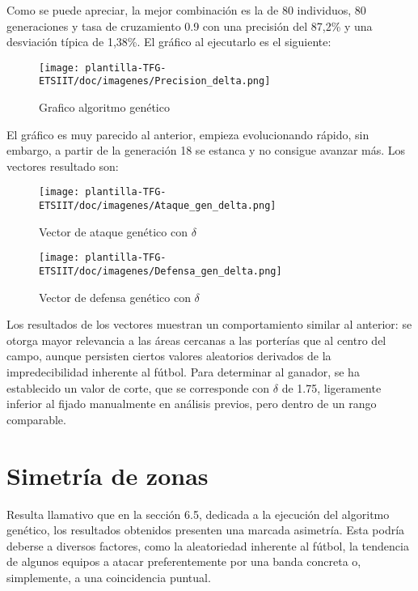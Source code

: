 Como se puede apreciar, la mejor combinación es la de 80 individuos, 80 generaciones y tasa de cruzamiento 0.9 con una precisión del 87,2\% y una desviación típica de 1,38\%. El gráfico al ejecutarlo es el siguiente:

\begin{figure}[H]
    \centering
    \texttt{[image: plantilla-TFG-ETSIIT/doc/imagenes/Precision\_delta.png]}
    \caption{Grafico algoritmo genético}
    \label{fig:etiqueta-imagen}
\end{figure}

El gráfico es muy parecido al anterior, empieza evolucionando rápido, sin embargo, a partir de la generación 18 se estanca y no consigue avanzar más. Los vectores resultado son:

\begin{figure}[H]
    \centering
    \texttt{[image: plantilla-TFG-ETSIIT/doc/imagenes/Ataque\_gen\_delta.png]}
    \caption{Vector de ataque genético con $\delta$}
    \label{fig:etiqueta-imagen}
\end{figure}

\begin{figure}[H]
    \centering
    \texttt{[image: plantilla-TFG-ETSIIT/doc/imagenes/Defensa\_gen\_delta.png]}
    \caption{Vector de defensa genético con $\delta$}
    \label{fig:etiqueta-imagen}
\end{figure}

Los resultados de los vectores muestran un comportamiento similar al anterior: se otorga mayor relevancia a las áreas cercanas a las porterías que al centro del campo, aunque persisten ciertos valores aleatorios derivados de la impredecibilidad inherente al fútbol. Para determinar al ganador, se ha establecido un valor de corte, que se corresponde con $\delta$ de 1.75, ligeramente inferior al fijado manualmente en análisis previos, pero dentro de un rango comparable.

\section{Simetría de zonas}
Resulta llamativo que en la sección 6.5, dedicada a la ejecución del algoritmo genético, los resultados obtenidos presenten una marcada asimetría. Esta podría deberse a diversos factores, como la aleatoriedad inherente al fútbol, la tendencia de algunos equipos a atacar preferentemente por una banda concreta o, simplemente, a una coincidencia puntual.

